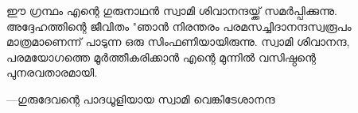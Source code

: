 \newpage
{}

ഈ ഗ്രന്ഥം എന്റെ ഗുരുനാഥന്‍ സ്വാമി ശിവാനന്ദയ്ക്ക്‌ സമര്‍പ്പിക്കുന്നു. അദ്ദേഹത്തിന്റെ ജീവിതം "ഞാന്‍ നിരന്തരം പരമസച്ചിദാനന്ദസ്വരൂപം മാത്രമാണെന്ന് പാടുന്ന ഒരു സിംഫണിയായിരുന്നു. സ്വാമി ശിവാനന്ദ, പരമയോഗത്തെ മൂര്‍ത്തീകരിക്കാന്‍ എന്റെ മുന്നില്‍ വസിഷ്ഠന്റെ  പുനരവതാരമായി.
               
---ഗുരുദേവന്റെ പാദധൂളിയായ സ്വാമി വെങ്കിടേശാനന്ദ
